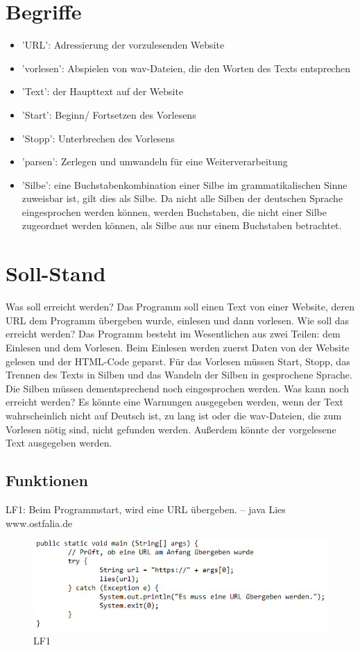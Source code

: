 \documentclass[12pt]{scrartcl}
\begin{document}
\section{Begriffe}
\begin{itemize}
    \item 'URL': Adressierung der vorzulesenden Website
    \item 'vorlesen': Abspielen von wav-Dateien, die den Worten des Texts entsprechen
    \item 'Text': der Haupttext auf der Website
    \item 'Start': Beginn/ Fortsetzen des Vorlesens
    \item 'Stopp': Unterbrechen des Vorlesens
    \item 'parsen': Zerlegen und umwandeln für eine Weiterverarbeitung
    \item 'Silbe': eine Buchstabenkombination einer Silbe im grammatikalischen Sinne zuweisbar ist, gilt dies als Silbe. Da nicht alle Silben der deutschen Sprache eingesprochen werden können, werden Buchstaben, die nicht                 einer Silbe zugeordnet werden können, als Silbe aus nur einem Buchstaben betrachtet.
\end{itemize}

\section{Soll-Stand}
Was soll erreicht werden?
Das Programm soll einen Text von einer Website, deren URL dem Programm übergeben wurde, einlesen und dann vorlesen.
Wie soll das erreicht werden?
Das Programm besteht im Wesentlichen aus zwei Teilen: dem Einlesen und dem Vorlesen. Beim Einlesen werden zuerst Daten von der Website gelesen und der HTML-Code geparst. Für das Vorlesen müssen Start, Stopp, das Trennen des Texts in Silben und das Wandeln der Silben in gesprochene Sprache. Die Silben müssen dementsprechend noch eingesprochen werden.
Was kann noch erreicht werden?
Es könnte eine Warnungen ausgegeben werden, wenn der Text wahrscheinlich nicht auf Deutsch ist, zu lang ist oder die wav-Dateien, die zum Vorlesen nötig sind, nicht gefunden werden. Außerdem könnte der vorgelesene Text ausgegeben werden.


\subsection{Funktionen}

LF1: Beim Programmstart, wird eine URL übergeben.\newline
-- java Lies www.ostfalia.de
\begin{figure}[hp!]
 \centering
 \includegraphics[width=1.0\textwidth]{res/LF1}
 \caption{LF1}
 \label{fig: fig1}
\end{figure}
~
\end{document}
